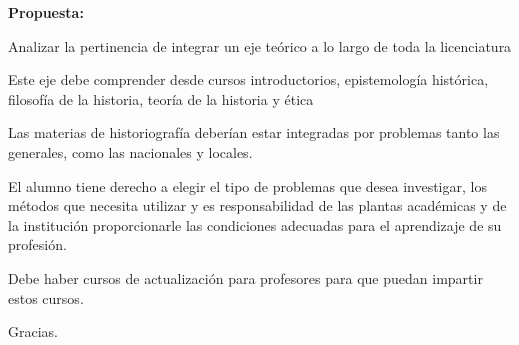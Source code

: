 \textbf{Propuesta:}

Analizar la pertinencia de integrar un eje teórico a lo largo de toda la
licenciatura

Este eje debe comprender desde cursos introductorios, epistemología
histórica, filosofía de la historia, teoría de la historia y ética 

Las materias de historiografía deberían estar integradas por problemas tanto
las generales, como las nacionales y locales. 

El alumno tiene derecho a elegir el tipo de problemas que desea investigar,
los métodos que necesita utilizar y es responsabilidad de las plantas
académicas y de la institución proporcionarle las condiciones adecuadas
para el aprendizaje de su profesión.

Debe haber cursos de actualización para profesores para que puedan impartir
estos cursos. 

Gracias. 

%